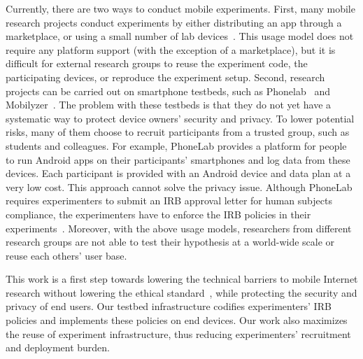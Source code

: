Currently, there are two ways to conduct mobile experiments. 
First, many mobile research projects conduct experiments 
by either distributing an app through a marketplace, or using a 
small number of lab devices~\cite{hao2013isleep, wang2012no, 
wang2013sensing}. This usage model does not require any 
platform support (with the exception of a marketplace), but it 
is difficult for external research groups to reuse the experiment 
code, the participating devices, or reproduce the experiment 
setup. Second, research projects can be carried out on 
smartphone testbeds, such as Phonelab~\cite{phonelab, 
nandugudi2013phonelab} and 
Mobilyzer~\cite{nikravesh2015mobilyzer}. 
The problem with these testbeds is that they do not yet 
have a systematic way to protect device owners' security and 
privacy. To lower potential risks, many of them choose to 
recruit participants from a trusted group, such as students and 
colleagues. For example, PhoneLab provides a platform for 
people to run Android apps on their participants' smartphones 
and log data from these devices. Each participant is provided 
with an Android device and data plan at a very low cost. This 
approach cannot solve the privacy issue. Although PhoneLab 
requires experimenters to submit an IRB approval letter for 
human subjects compliance, the experimenters have to enforce
the IRB policies in their experiments~\cite{nandugudi2013phonelab}. 
Moreover, with the above usage models, researchers from 
different research groups are not able to test their hypothesis 
at a world-wide scale or reuse each others' user base.
					
This work is a first step towards lowering the technical
barriers to mobile Internet research without lowering the
ethical standard~\cite{zevenbergen2013ethical}, while 
protecting the security and privacy of end users. Our testbed 
infrastructure codifies experimenters' IRB policies and 
implements these policies on end devices. Our work also 
maximizes the reuse of experiment infrastructure, thus reducing 
experimenters' recruitment and deployment burden. 

